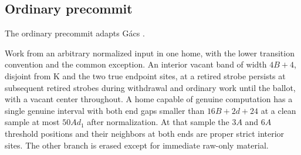 \subsection{Ordinary precommit}
The ordinary precommit adapts G\'acs \cite[Sections~12--13]{gacs86}.
\begin{lemma}\label{lem:ordinary-start}
Work from an arbitrary normalized input in one home, with the lower transition convention and the common exception. An interior vacant band of width \(4B+4\), disjoint from K and the two true endpoint sites, at a retired strobe persists at subsequent retired strobes during withdrawal and ordinary work until the ballot, with a vacant center throughout. A home capable of genuine computation has a single genuine interval with both end gaps smaller than \(16B+2d+24\) at a clean sample at most \(50A d_1\) after normalization. At that sample the \(3A\) and \(6A\) threshold positions and their neighbors at both ends are proper strict interior sites. The other branch is erased except for immediate raw-only material.
\end{lemma}
